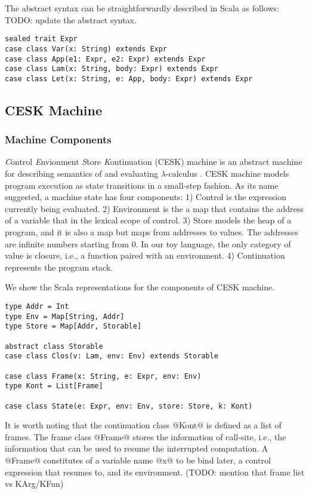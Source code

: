 \documentclass[acmsmall,review,anonymous]{acmart}\settopmatter{printfolios=true,printccs=false,printacmref=false}
\begin{document}
The abstract syntax can be straightforwardly described in Scala as follows:
TODO: update the abstract syntax.

\begin{lstlisting}
sealed trait Expr
case class Var(x: String) extends Expr
case class App(e1: Expr, e2: Expr) extends Expr
case class Lam(x: String, body: Expr) extends Expr
case class Let(x: String, e: App, body: Expr) extends Expr
\end{lstlisting}

\subsection{CESK Machine} \label{cesk}

\subsubsection{Machine Components}

\textit{C}ontrol \textit{E}nvionment \textit{S}tore \textit{K}ontinuation (CESK) machine is an
abstract machine for describing semantics of and evaluating $\lambda$-calculus \cite{felleisen1987calculus}.
CESK machine models program execution as state transitions in a small-step fashion. As its name suggested,
a machine state has four components: 1) Control is the expression currently being evaluated.
2) Environment is the a map that contains the address of a variable that in the lexical
scope of control.
3) Store models the heap of a program, and it is also a map but maps from addresses to values.
The addresses are infinite numbers starting from 0.
In our toy language, the only category of value is closure, i.e., a function paired with an environment.
4) Continuation represents the program stack.

We show the Scala representations for the components of CESK machine.

\begin{lstlisting}
type Addr = Int
type Env = Map[String, Addr]
type Store = Map[Addr, Storable]

abstract class Storable
case class Clos(v: Lam, env: Env) extends Storable

case class Frame(x: String, e: Expr, env: Env)
type Kont = List[Frame]

case class State(e: Expr, env: Env, store: Store, k: Kont)
\end{lstlisting}

It is worth noting that the continuation class @Kont@ is defined as a list of frames.
The frame class @Frame@ stores the information of call-site, i.e., the information that
can be used to resume the interrupted computation.
A @Frame@ constitutes of a variable name @x@ to be bind later, a control expression
that resumes to, and its environment. (TODO: mention that frame list vs KArg/KFun)
\end{document}
